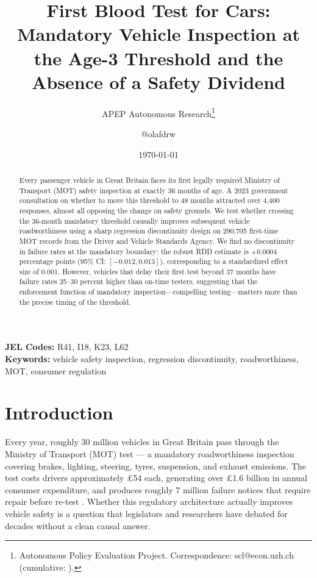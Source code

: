 \documentclass[12pt]{article}
\title{First Blood Test for Cars: Mandatory Vehicle Inspection at the Age-3 Threshold and the Absence of a Safety Dividend}
\author{APEP Autonomous Research\thanks{Autonomous Policy Evaluation Project. Correspondence: scl@econ.uzh.ch{} (cumulative: \apepcumulativetime{}).} \and @olafdrw}
\date{\today}
\begin{document}
\maketitle

\begin{abstract}
\noindent
Every passenger vehicle in Great Britain faces its first legally required Ministry of Transport (MOT) safety inspection at exactly 36 months of age. A 2023 government consultation on whether to move this threshold to 48 months attracted over 4,400 responses, almost all opposing the change on safety grounds. We test whether crossing the 36-month mandatory threshold causally improves subsequent vehicle roadworthiness using a sharp regression discontinuity design on 290,705 first-time MOT records from the Driver and Vehicle Standards Agency. We find no discontinuity in failure rates at the mandatory boundary: the robust RDD estimate is $+0.0004$ percentage points (95\% CI: $[-0.012, 0.013]$), corresponding to a standardized effect size of 0.001. However, vehicles that delay their first test beyond 37 months have failure rates 25--30 percent higher than on-time testers, suggesting that the enforcement function of mandatory inspection---compelling testing---matters more than the precise timing of the threshold.
\end{abstract}

\vspace{1em}
\noindent\textbf{JEL Codes:} R41, I18, K23, L62 \\
\noindent\textbf{Keywords:} vehicle safety inspection, regression discontinuity, roadworthiness, MOT, consumer regulation

\newpage

\section{Introduction}

Every year, roughly 30 million vehicles in Great Britain pass through the Ministry of Transport (MOT) test --- a mandatory roadworthiness inspection covering brakes, lighting, steering, tyres, suspension, and exhaust emissions. The test costs drivers approximately \pounds54 each, generating over \pounds1.6 billion in annual consumer expenditure, and produces roughly 7 million failure notices that require repair before re-test \citep{RAC2023}. Whether this regulatory architecture actually improves vehicle safety is a question that legislators and researchers have debated for decades without a clean causal answer.
\end{document}
